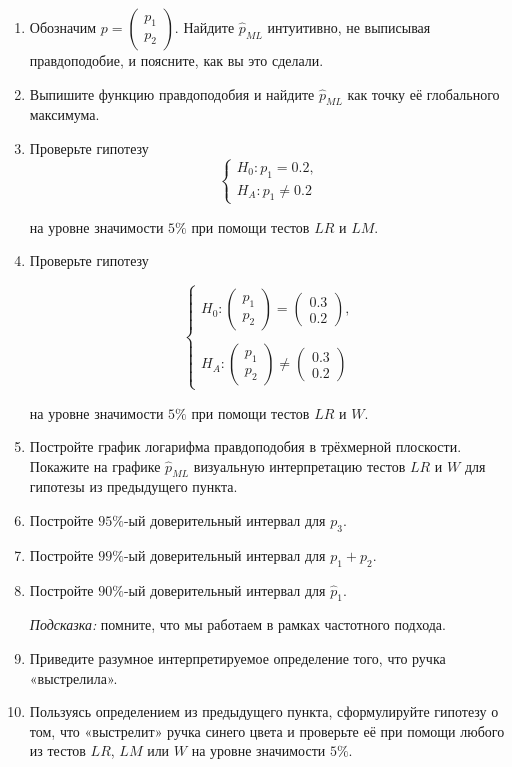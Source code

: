 \documentclass[10pt, a4paper]{extarticle}
\begin{document}
	\begin{enumerate}
		\item Обозначим $p = \begin{pmatrix}
			p_1 \\
			p_2
		\end{pmatrix}$. Найдите $\hat{p}_{ML}$ интуитивно, не выписывая правдоподобие, и поясните, как вы это сделали.
		\item Выпишите функцию правдоподобия и найдите $\hat{p}_{ML}$ как точку её глобального максимума.
		\item Проверьте гипотезу
		\[\begin{cases}
			H_0: p_1 = 0.2, \\
			H_A: p_1 \ne 0.2
		\end{cases}
		\] 
		
		на уровне значимости $5\%$ при помощи тестов $LR$ и $LM$.
		\item Проверьте гипотезу
		
		\[
		\begin{cases}
			H_0: \begin{pmatrix}
				p_1 \\
				p_2
			\end{pmatrix} = \begin{pmatrix}
				0.3 \\
				0.2
			\end{pmatrix},\\\\
		H_A: \begin{pmatrix}
			p_1 \\
			p_2
		\end{pmatrix} \ne \begin{pmatrix}
			0.3 \\
			0.2
		\end{pmatrix}
		\end{cases}
		\]
		
		на уровне значимости $5\%$ при помощи тестов $LR$ и $W$.
		\item Постройте график логарифма правдоподобия в трёхмерной плоскости. Покажите на графике $\hat{p}_{ML}$ визуальную интерпретацию тестов $LR$ и $W$ для гипотезы из предыдущего пункта.
		\item Постройте $95\%$-ый доверительный интервал для $p_3$.
		\item Постройте $99\%$-ый доверительный интервал для $p_1 + p_2$.
		\item Постройте $90\%$-ый доверительный интервал для $\hat{p}_1$.
		
		\textit{Подсказка:} помните, что мы работаем в рамках частотного подхода.
		
		\item Приведите разумное интерпретируемое определение того, что ручка «выстрелила».
		
		\item Пользуясь определением из предыдущего пункта, сформулируйте гипотезу о том, что «выстрелит» ручка синего цвета и проверьте её при помощи любого из тестов $LR$, $LM$ или $W$ на уровне значимости $5\%$.
	\end{enumerate}
\end{document}
